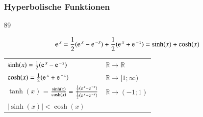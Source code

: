 \subsubsection{Hyperbolische Funktionen}{89}

$$ \e^x = \frac{1}{2} (\e^x - \e^{-x}) + \frac{1}{2} (\e^x + \e^{-x}) = \sinh(x) + \cosh(x) $$ 

\renewcommand{\arraystretch}{1.5}
\begin{tabular}{ll}
    $\sinh(x) = \frac{1}{2} (\e^x - \e^{-x})$ & $\mathbb{R} \to \mathbb{R}$  \\
    $\cosh(x) = \frac{1}{2} (\e^x + \e^{-x})$ & $\mathbb{R} \to [1; \infty)$ \\
    $\tanh(x)$ = $\frac{\sinh(x)}{\cosh(x)} = \frac{\frac{1}{2} (\e^x - \e^{-x})}{\frac{1}{2} (\e^x + \e^{-x})}$ & $\mathbb{R} \to (-1; 1)$ \\	

    $\vert \sinh(x) \vert < \cosh(x)$	& 
\end{tabular}
\renewcommand{\arraystretch}{1}
